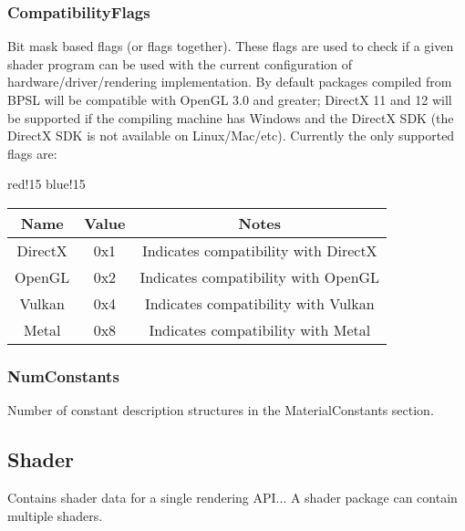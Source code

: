 \subsubsection{CompatibilityFlags}
Bit mask based flags (or flags together). These flags are used to check if a given shader program can be used with the current configuration of hardware/driver/rendering implementation. By default packages compiled from BPSL will be compatible with OpenGL 3.0 and greater; DirectX 11 and 12 will be supported if the compiling machine has Windows and the DirectX SDK (the DirectX SDK is not available on Linux/Mac/etc).\newline
Currently the only supported flags are:
\begin{center}
    {
        {red!15}
        {blue!15}
        \begin{tabular}{|c|c|c|}
            \hline
            \textbf{Name} & \textbf{Value} & \textbf{Notes} \\
    
            \hline\hline
            DirectX & 0x1 & Indicates compatibility with DirectX \cite{DirectX} \\
            OpenGL & 0x2 & Indicates compatibility with OpenGL \cite{OpenGL} \\
            Vulkan & 0x4 & Indicates compatibility with Vulkan \cite{Vulkan} \\
            Metal & 0x8 & Indicates compatibility with Metal \cite{Metal} \\
            \hline
        \end{tabular}
    }
\end{center}

\subsubsection{NumConstants}
Number of constant description structures in the MaterialConstants section.

\subsection{Shader}
Contains shader data for a single rendering API...\newline
A shader package can contain multiple shaders.

